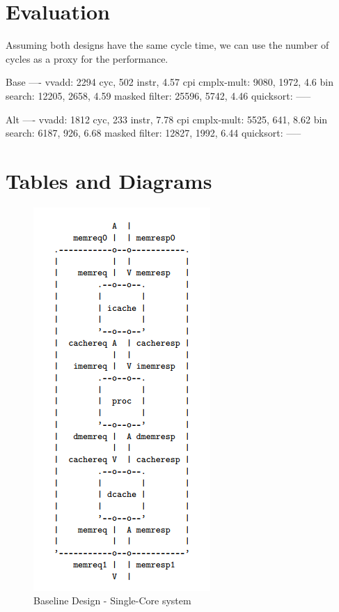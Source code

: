 \documentclass[10pt]{article}
\begin{document}
\section{Evaluation}

Assuming both designs have the same cycle time, we can use
the number of cycles as a proxy for the performance.

Base
----
vvadd:     2294 cyc, 502 instr, 4.57 cpi
cmplx-mult: 9080, 1972, 4.6
bin search: 12205, 2658, 4.59
masked filter: 25596, 5742, 4.46
quicksort: -----

Alt
----
vvadd:     1812 cyc, 233 instr, 7.78 cpi
cmplx-mult: 5525, 641, 8.62
bin search: 6187, 926, 6.68
masked filter: 12827, 1992, 6.44
quicksort: -----


\newpage
\section {Tables and Diagrams}


\begin{figure}[H]
	\centering
	\includegraphics{bline_diag}
	\caption{Baseline Design - Single-Core system}
	\label{fig:bline}
\end{figure}
\end{document}
